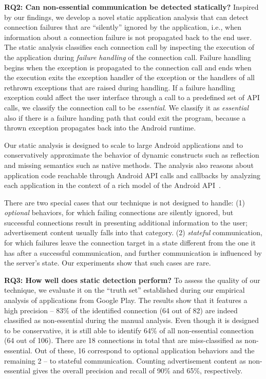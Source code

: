 \vspace{0.1in}
\noindent 
{\bf RQ2: Can non-essential communication be detected statically?}
Inspired by our findings, we develop a novel static application
analysis that can detect connection failures that are ``silently''
ignored by the application, i.e., when information about a connection
failure is not propagated back to the end user.  The static analysis
classifies each connection call by inspecting the execution of the
application during {\it failure handling} of the connection call.
Failure handling begins when the exception is propagated to the
connection call and ends when the execution exits the exception
handler of the exception or the handlers of all rethrown exceptions
that are raised during handling.
If a failure handling exception could affect the user interface
through a call to a predefined set of API calls, we classify the
connection call to be {\em essential}.  We classify it as {\em essential}
also if there is a failure handing
path that could exit the program, because a thrown exception
propagates back into the Android runtime.

Our static analysis is designed to scale to large Android applications
and to conservatively approximate the behavior of dynamic constructs
such as reflection and missing semantics such as native methods.  The
analysis also reasons about application code reachable through Android
API calls and callbacks by analyzing each application in the context
of a rich model of the Android
API~\cite{Gordon:Kim:Perkins:Gilham:Nguyen:Rinard:NDSS15}. 

There are two special cases that our technique is not designed to handle: (1) \emph{optional} behaviors, for which failing connections are silently ignored, but successful connections result in presenting additional information to the user; 
advertisement content usually falls into that category. (2) \emph{stateful} communication, for which failures leave the 
connection target in a state different from the one it has after a successful communication, and further communication is influenced by the server's state. Our experiments show that such cases are rare. 

\vspace{0.05in}
\noindent 
{\bf RQ3: How well does static detection perform?}
To assess the quality of our technique, we evaluate it on the ``truth set'' established during our empirical analysis of applications from Google Play.
The results show that it features a high precision -- 83\% of the identified connection (64 out of 82) are indeed classified as non-essential during the manual analysis. Even though it is designed to be conservative, it is still able to identify  64\% of all non-essential connection (64 out of 106).
There are 18 connections in total that are miss-classified as non-essential. Out of these, 16 correspond to optional application behaviors and the remaining 2 -- to stateful communication. Counting advertisement content as non-essential
gives the overall precision and recall of 90\% and 65\%, respectively.  

